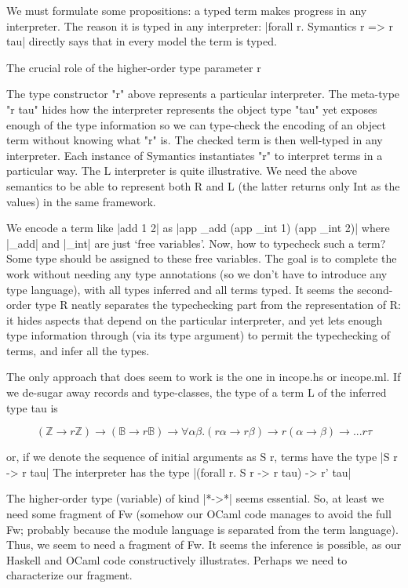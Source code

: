 \documentclass[preprint]{sigplanconf}
\newcommand{\ZZ}{\mathbb{Z}}
\newcommand{\BB}{\mathbb{B}}
\begin{document}
We must formulate some propositions: a typed term makes progress in
any interpreter. The reason it is typed in any interpreter:
|forall r. Symantics r => r tau| directly says that in every model the
term is typed. 

The crucial role of the higher-order type parameter r

The type constructor "r" above represents a particular interpreter.  The
meta-type "r tau" hides how the interpreter represents the object type
"tau" yet exposes enough of the type information so we can type-check
the encoding of an object term without knowing what "r" is.  The checked
term is then well-typed in any interpreter.  Each instance of Symantics
instantiates "r" to interpret terms in a particular way. The L
interpreter is quite illustrative. We need the above semantics to be
able to represent both R and L (the latter returns only Int as the
values) in the same framework.

We encode a term like |add 1 2| as
|app _add (app _int 1) (app _int 2)| where |_add| and |_int| are just
`free variables'. Now, how to typecheck such a term? Some type should
be assigned to these free variables. The goal is to complete the work
without needing any type annotations (so we don't have to introduce any
type language), with all types inferred and all terms typed. It seems
the second-order type R neatly separates the typechecking part from
the representation of R: it hides aspects that depend on the
particular interpreter, and yet lets enough type information through
(via its type argument) to permit the typechecking of terms, and infer
all the types. 



The only approach that does seem to work
is the one in incope.hs or incope.ml. If we de-sugar away records and
type-classes, the type of a term L of the inferred type tau is

$$ 
  (\ZZ \rightarrow r \ZZ) \rightarrow
  (\BB \rightarrow r \BB) \rightarrow
  \forall \alpha \beta. (r \alpha \rightarrow r \beta)
      \rightarrow r (\alpha\rightarrow\beta) \rightarrow ... r \tau
$$

or, if we denote the sequence of initial arguments as S r, terms have
the type |S r -> r tau|
The interpreter has the type
|(forall r. S r -> r tau) -> r' tau|

The higher-order type (variable) of kind |*->*| seems essential. So, at
least we need some fragment of Fw (somehow our OCaml code manages to
avoid the full Fw; probably because the module language is separated
from the term language). Thus, we seem to need a fragment of Fw. It
seems the inference is possible, as our Haskell and OCaml code
constructively illustrates. Perhaps we need to characterize our
fragment.
\end{document}
